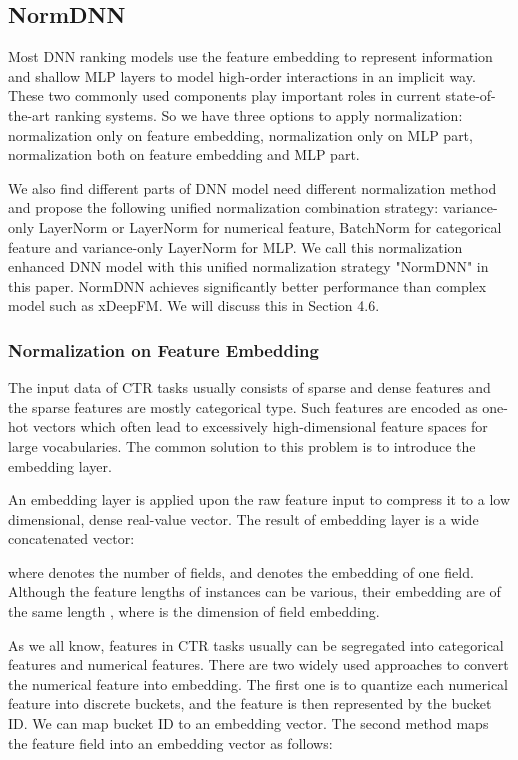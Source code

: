 \documentclass[sigconf]{acmart}
\begin{document}
\subsection{NormDNN}
Most DNN ranking models use the feature embedding to represent information and shallow MLP layers to model high-order interactions in an implicit way. These two commonly used components play important roles in current state-of-the-art ranking systems. So we have three options to apply normalization: normalization only on feature embedding, normalization only on MLP part, normalization both on feature embedding and MLP part.

We also find different parts of DNN model need different normalization method and propose the following unified normalization combination strategy: variance-only LayerNorm or LayerNorm for numerical feature, BatchNorm for categorical feature and variance-only LayerNorm for MLP.  We call this normalization enhanced DNN model with this unified normalization strategy "NormDNN" in this paper. NormDNN achieves significantly better performance than complex model such as xDeepFM.  We will discuss this in Section 4.6.

 \subsubsection{\textbf{Normalization on Feature Embedding}}


The input data of CTR tasks usually consists of sparse and dense features and the sparse features are mostly categorical type. Such features are encoded as one-hot vectors which often lead to excessively high-dimensional feature spaces for large vocabularies. The common solution to this problem is to introduce the embedding layer.


An embedding layer is applied upon the raw feature input to compress it to a low dimensional, dense real-value vector. The result of embedding layer is a wide concatenated vector:


where  denotes the number of fields, and  denotes the embedding of one field. Although the feature lengths of instances can be various, their embedding are of the same length , where  is the dimension of field embedding.

As we all know, features in CTR tasks usually can be segregated into categorical features and numerical features. There are two widely used approaches to convert the numerical feature into embedding. The first one is to quantize each numerical feature into discrete buckets, and the feature is then represented by the bucket ID. We can map bucket ID to an embedding vector. The second method maps the feature field into an embedding vector as follows:
\end{document}
